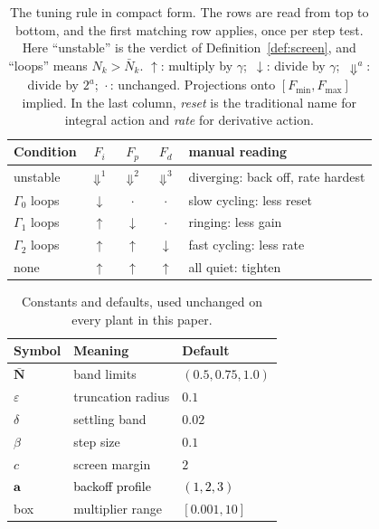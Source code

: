 \documentclass[final,3p,times,twocolumn]{elsarticle}
\newcommand{\fix}[1]{#1}  %
\newcommand{\new}[1]{\textcolor{black}{#1}}  %
\begin{document}
\begin{table}[tb]
\centering
\caption{The tuning rule in compact form. The rows are read from top to
bottom, and the first matching row applies, once per step test. Here
``unstable'' is the verdict of Definition~\ref{def:screen}, and
``loops'' means $N_k > \bar N_k$.
$\uparrow$: multiply by $\gamma$;\ $\downarrow$: divide by $\gamma$;\
$\Downarrow^{a}$: divide by $2^{a}$;\
$\cdot$\,: unchanged. Projections onto $[F_{\min},F_{\max}]$ implied.
In the last column, \emph{reset} is the traditional name for integral
action and \emph{rate} for derivative action.}
\label{tab:rule}
\footnotesize
\setlength{\tabcolsep}{4pt}
\begin{tabular}{lcccl}
\toprule
Condition & $F_i$ & $F_p$ & $F_d$ & manual reading \\
\midrule
unstable & $\Downarrow^{1}$ & $\Downarrow^{2}$ & $\Downarrow^{3}$ &
diverging: back off, rate hardest \\
$\Gamma_0$ loops & $\downarrow$ & $\cdot$ & $\cdot$ &
slow cycling: less reset \\
$\Gamma_1$ loops & $\uparrow$ & $\downarrow$ & $\cdot$ &
ringing: less gain \\
$\Gamma_2$ loops & $\uparrow$ & $\uparrow$ & $\downarrow$ &
fast cycling: less rate \\
none & $\uparrow$ & $\uparrow$ & $\uparrow$ &
all quiet: tighten \\
\bottomrule
\end{tabular}
\end{table}

\begin{table}[tb]
\centering
\caption{Constants and defaults, used unchanged on every plant in this
paper.}
\label{tab:defaults}
\begin{tabular}{lll}
\toprule
Symbol & Meaning & Default \\
\midrule
$\bar{\mathbf N}$ & band limits & $(0.5, 0.75, 1.0)$ \\
$\varepsilon$ & truncation radius & $0.1$ \\
$\delta$ & settling band & $0.02$ \\
$\beta$ & step size & $0.1$ \\
\fix{$c$} & \fix{screen margin} & \fix{$2$} \\
\new{$\mathbf a$} & \new{backoff profile} & \new{$(1,2,3)$} \\
box & multiplier range & $[0.001, 10]$ \\
\bottomrule
\end{tabular}
\end{table}
\end{document}
